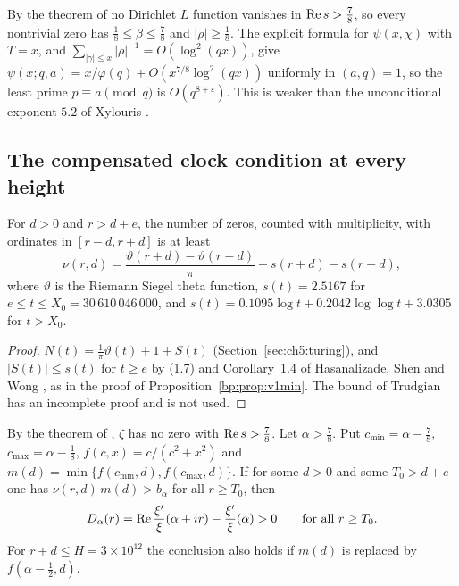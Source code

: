 \begin{remark}\label{tx5:rem:leastprime}
By the theorem of \cite{OAI26a} no Dirichlet $L$ function vanishes in $\operatorname{Re} s>\frac78$, so every nontrivial zero has $\frac18\le\beta\le\frac78$ and $|\rho|\ge\frac18$. The explicit formula for $\psi(x,\chi)$ \cite[Chapters~19 and 20]{Davenport} with $T=x$, and $\sum_{|\gamma|\le x}|\rho|^{-1}=O(\log^2(qx))$, give $\psi(x;q,a)=x/\varphi(q)+O(x^{7/8}\log^2(qx))$ uniformly in $(a,q)=1$, so the least prime $p\equiv a\pmod q$ is $O(q^{8+\varepsilon})$. This is weaker than the unconditional exponent $5.2$ of Xylouris \cite{Xylouris11}.
\end{remark}

\subsection{The compensated clock condition at every height}

\begin{lemma}\label{pol:lem:window}
For $d>0$ and $r>d+e$, the number of zeros, counted with multiplicity, with ordinates in $[r-d,r+d]$ is at least
\[
\nu(r,d)=\frac{\vartheta(r+d)-\vartheta(r-d)}{\pi}-s(r+d)-s(r-d),
\]
where $\vartheta$ is the Riemann Siegel theta function, $s(t)=2.5167$ for $e\le t\le X_0=30\,610\,046\,000$, and $s(t)=0.1095\log t+0.2042\log\log t+3.0305$ for $t>X_0$.
\end{lemma}

\begin{proof}
$N(t)=\frac1\pi\vartheta(t)+1+S(t)$ (Section~\ref{sec:ch5:turing}), and $|S(t)|\le s(t)$ for $t\ge e$ by (1.7) and Corollary~1.4 of Hasanalizade, Shen and Wong \cite{HSW22}, as in the proof of Proposition~\ref{bp:prop:v1min}. The bound of Trudgian \cite{Trudgian} has an incomplete proof \cite{BMOR21,HSW22} and is not used.
\end{proof}

\begin{theorem}\label{pol:thm:qrhcomp}
By the theorem of \cite{OAI26a}, $\zeta$ has no zero with $\operatorname{Re} s>\frac78$. Let $\alpha>\frac78$. Put $c_{\min}=\alpha-\frac78$, $c_{\max}=\alpha-\frac18$, $f(c,x)=c/(c^2+x^2)$ and $m(d)=\min\{f(c_{\min},d),f(c_{\max},d)\}$. If for some $d>0$ and some $T_0>d+e$ one has $\nu(r,d)\,m(d)>b_\alpha$ for all $r\ge T_0$, then
\[
D_\alpha(r)=\operatorname{Re}\frac{\xi'}{\xi}(\alpha+ir)-\frac{\xi'}{\xi}(\alpha)>0\qquad\text{for all } r\ge T_0 .
\]
For $r+d\le H=3\times10^{12}$ the conclusion also holds if $m(d)$ is replaced by $f(\alpha-\frac12,d)$.
\end{theorem}

